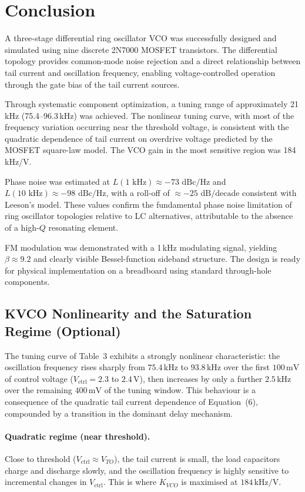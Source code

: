 \documentclass[11pt]{article}
\begin{document}
\section{Conclusion}

A three-stage differential ring oscillator VCO was successfully designed and simulated
using nine discrete 2N7000 MOSFET transistors. The differential topology provides
common-mode noise rejection and a direct relationship between tail current and oscillation
frequency, enabling voltage-controlled operation through the gate bias of the tail current
sources.

Through systematic component optimization, a tuning range of approximately 21\,kHz
(75.4--96.3\,kHz) was achieved. The nonlinear tuning curve, with most of the frequency
variation occurring near the threshold voltage, is consistent with the quadratic dependence
of tail current on overdrive voltage predicted by the MOSFET square-law model. The
VCO gain in the most sensitive region was 184\,kHz/V.

Phase noise was estimated at $L(1\text{ kHz}) \approx -73\text{ dBc/Hz}$ and
$L(10\text{ kHz}) \approx -98\text{ dBc/Hz}$, with a roll-off of $\approx -25\text{ dB/decade}$
consistent with Leeson’s model. These values confirm the fundamental phase noise
limitation of ring oscillator topologies relative to LC alternatives, attributable to the
absence of a high-$Q$ resonating element.

FM modulation was demonstrated with a 1\,kHz modulating signal, yielding
$\beta \approx 9.2$ and clearly visible Bessel-function sideband structure. The design is
ready for physical implementation on a breadboard using standard through-hole
components.
\subsection{KVCO Nonlinearity and the Saturation Regime (Optional) }
 
The tuning curve of Table~3 exhibits a strongly nonlinear characteristic: the
oscillation frequency rises sharply from $75.4\,\mathrm{kHz}$ to
$93.8\,\mathrm{kHz}$ over the first $100\,\mathrm{mV}$ of control voltage
($V_{\mathrm{ctrl}} = 2.3$ to $2.4\,\mathrm{V}$), then increases by only
a further $2.5\,\mathrm{kHz}$ over the remaining $400\,\mathrm{mV}$ of the
tuning window. This behaviour is a consequence of the quadratic tail current
dependence of Equation~(6), compounded by a transition in the dominant delay
mechanism.
 
\paragraph{Quadratic regime (near threshold).}
Close to threshold ($V_{\mathrm{ctrl}} \approx V_{TO}$), the tail current is
small, the load capacitors charge and discharge slowly, and the oscillation
frequency is highly sensitive to incremental changes in $V_{\mathrm{ctrl}}$.
This is where $K_{VCO}$ is maximised at $184\,\mathrm{kHz/V}$.
 
\end{document}
